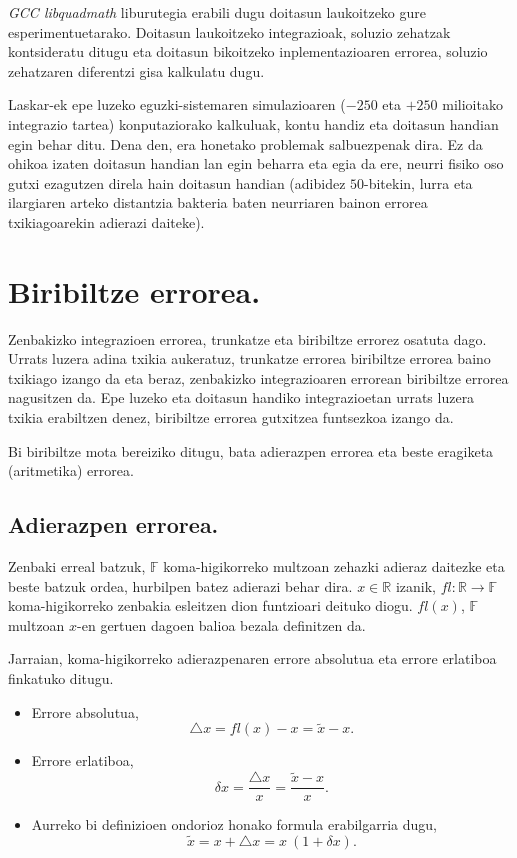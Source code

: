 \emph{GCC libquadmath} liburutegia erabili dugu doitasun laukoitzeko gure esperimentuetarako. Doitasun laukoitzeko integrazioak, soluzio zehatzak kontsideratu ditugu eta  doitasun bikoitzeko inplementazioaren errorea, soluzio zehatzaren diferentzi gisa kalkulatu dugu. 

Laskar-ek epe luzeko eguzki-sistemaren simulazioaren ($-250$ eta $+250$ milioitako integrazio tartea) konputaziorako kalkuluak, kontu handiz eta doitasun handian egin behar ditu. Dena den, era honetako problemak salbuezpenak dira. Ez da ohikoa izaten doitasun handian lan egin beharra eta egia da ere, neurri fisiko oso gutxi ezagutzen direla  hain doitasun handian (adibidez $50$-bitekin, lurra eta ilargiaren arteko distantzia bakteria baten neurriaren  bainon errorea txikiagoarekin adierazi daiteke).  


\section{Biribiltze errorea.}

Zenbakizko integrazioen errorea, trunkatze eta biribiltze errorez osatuta dago. Urrats luzera adina txikia aukeratuz, trunkatze errorea biribiltze errorea baino txikiago izango da eta beraz, zenbakizko integrazioaren errorean biribiltze errorea nagusitzen da. Epe luzeko eta doitasun handiko integrazioetan urrats luzera txikia erabiltzen denez, biribiltze errorea gutxitzea funtsezkoa izango da.     

Bi biribiltze mota bereiziko ditugu, bata adierazpen errorea eta beste eragiketa (aritmetika) errorea.  

\subsection*{Adierazpen errorea.} 

Zenbaki erreal batzuk, $\mathbb{F}$ koma-higikorreko multzoan zehazki adieraz daitezke eta beste batzuk ordea, hurbilpen batez adierazi behar dira. $x \in \mathbb{R}$ izanik, $fl: \mathbb{R} \rightarrow \mathbb{F}$ koma-higikorreko zenbakia esleitzen dion funtzioari deituko diogu. $fl(x)$, $\mathbb{F}$ multzoan $x$-en gertuen dagoen balioa bezala definitzen da.   

Jarraian, koma-higikorreko adierazpenaren errore absolutua eta errore erlatiboa finkatuko ditugu.
\begin{itemize}
\item Errore absolutua,
\begin{equation*}
\triangle x= fl(x)-x= \tilde{x}-x. 
\end{equation*} 
\item Errore erlatiboa, 
\begin{equation*}
\delta x =\frac{\triangle x}{x} = \frac{\tilde{x}-x}{x}. 
\end{equation*}
\item Aurreko bi definizioen ondorioz honako formula erabilgarria dugu,
\begin{equation*}
\tilde{x}= x+\triangle x = x \ (1+\delta x).
\end{equation*}
\end{itemize}

